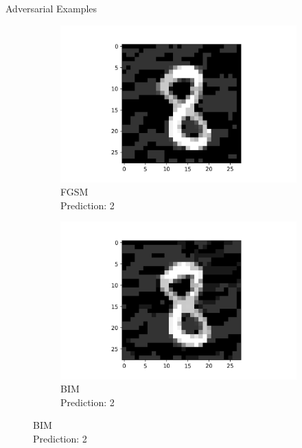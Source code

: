 \documentclass[9pt]{beamer}
\begin{document}
\begin{frame}{Adversarial Examples}
\label{adv_examples}

\begin{figure}
    \centering
    \tiny
    \begin{subfigure}[t]{0.24\linewidth}
        \centering
        \captionsetup{justification=centering}
        \includegraphics[width=\linewidth]{images/FGSM_2.png}
        \caption{FGSM\\Prediction: 2}
    \end{subfigure}
    \begin{subfigure}[t]{0.24\linewidth}
        \centering
        \captionsetup{justification=centering}
        \includegraphics[width=\linewidth]{images/BIM_2.png}
        \caption{BIM\\Prediction: 2}
    \end{subfigure}

\end{figure}
\end{frame}
\end{document}
